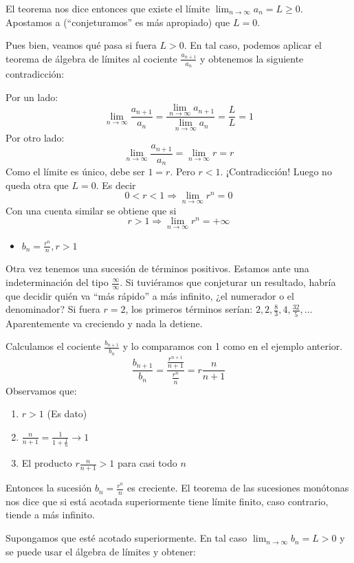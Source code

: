 \documentclass[../teoria.root.tex]{subfiles}
\begin{document}
El teorema nos dice entonces que existe el límite \(\lim_{n\to\infty}a_n=L\geq0\).
Apostamos a (“conjeturamos” es más apropiado) que \(L=0\).

Pues bien, veamos qué pasa si fuera \(L>0\).
En tal caso, podemos aplicar el teorema de álgebra de límites al cociente \(\frac{a_{n+1}}{a_n}\) y obtenemos la siguiente contradicción:

Por un lado:
\[\lim_{n\to\infty}\frac{a_{n+1}}{a_n}=\frac{\lim_{n\to\infty}a_{n+1}}{\lim_{n\to\infty}a_n}=\frac{L}{L}=1\]
Por otro lado:
\[\lim_{n\to\infty}\frac{a_{n+1}}{a_n}=\lim_{n\to\infty}r=r\]
Como el límite es único, debe ser \(1=r\).
Pero \(r<1\).
¡Contradicción!
Luego no queda otra que \(L=0\).
Es decir
\[0<r<1\Rightarrow\lim_{n\to\infty}r^n=0\]
Con una cuenta similar se obtiene que si
\[r>1\Rightarrow\lim_{n\to\infty}r^n=+\infty\]
\begin{itemize}
	\item \(b_n=\frac{r^n}{n}, r>1\)
\end{itemize}
Otra vez tenemos una sucesión de términos positivos.
Estamos ante una indeterminación del tipo \(\frac{\infty}{\infty}\).
Si tuviéramos que conjeturar un resultado, habría que decidir quién va ``más rápido'' a más infinito, ¿el numerador o el denominador?
Si fuera \(r=2\), los primeros términos serían:
\(2,2,\frac{8}{3},4,\frac{32}{5},\dots\)
Aparentemente va creciendo y nada la detiene.

Calculamos el cociente \(\frac{b_{n+1}}{b_n}\) y lo comparamos con 1 como en el ejemplo anterior.
\[\frac{b_{n+1}}{b_n}=\frac{\frac{r^{n+1}}{n+1}}{\frac{r^n}{n}}=r\frac{n}{n+1}\]
Observamos que:
\begin{enumerate}
	\item \(r>1\) (Es dato)
	\item \(\frac{n}{n+1}=\frac{1}{1+\frac{1}{n}}\rightarrow1\)
	\item El producto \(r\frac{n}{n+1}>1\) para casi todo \(n\)
\end{enumerate}
Entonces la sucesión \(b_n=\frac{r^n}{n}\) es creciente.
El teorema de las sucesiones monótonas nos dice que si está acotada superiormente tiene límite finito, caso contrario, tiende a más infinito.

Supongamos que esté acotado superiormente.
En tal caso \(\lim_{n\to\infty}b_n=L>0\) y se puede usar el álgebra de límites y obtener:
\end{document}
